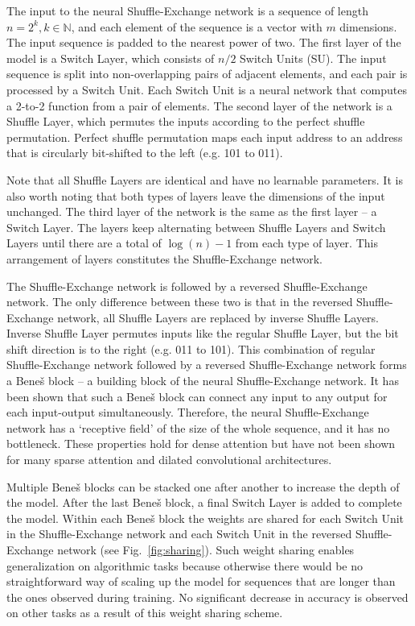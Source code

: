 \documentclass[letterpaper]{article} %
\begin{document}
The input to the neural Shuffle-Exchange network is a sequence of length $n=2^k, k \in \mathbb{N}$, and each element of the sequence is a vector with $m$ dimensions. The input sequence is padded to the nearest power of two. The first layer of the model is a Switch Layer, which consists of $n/2$ Switch Units (SU). The input sequence is split into non-overlapping pairs of adjacent elements, and each pair is processed by a Switch Unit. Each Switch Unit is a neural network that computes a 2-to-2 function from a pair of elements. The second layer of the network is a Shuffle Layer, which permutes the inputs according to the perfect shuffle permutation. Perfect shuffle permutation maps each input address to an address that is circularly bit-shifted to the left (e.g. 101 to 011).

Note that all Shuffle Layers are identical and have no learnable parameters. It is also worth noting that both types of layers leave the dimensions of the input unchanged. The third layer of the network is the same as the first layer -- a Switch Layer. The layers keep alternating between Shuffle Layers and Switch Layers until there are a total of $\log(n)-1$ from each type of layer. This arrangement of layers constitutes the Shuffle-Exchange network.

The Shuffle-Exchange network is followed by a reversed Shuffle-Exchange network. The only difference between these two is that in the reversed Shuffle-Exchange network, all Shuffle Layers are replaced by inverse Shuffle Layers. Inverse Shuffle Layer permutes inputs like the regular Shuffle Layer, but the bit shift direction is to the right (e.g. 011 to 101). This combination of regular Shuffle-Exchange network followed by a reversed Shuffle-Exchange network forms a Bene\v{s} block -- a building block of the neural Shuffle-Exchange network. It has been shown \citep{dally2004principles} that such a Bene\v{s} block can connect any input to any output for each input-output simultaneously. Therefore, the neural Shuffle-Exchange network has a `receptive field' of the size of the whole sequence, and it has no bottleneck. These properties hold for dense attention but have not been shown for many sparse attention and dilated convolutional architectures.

Multiple Bene\v{s} blocks can be stacked one after another to increase the depth of the model. After the last Bene\v{s} block, a final Switch Layer is added to complete the model. Within each Bene\v{s} block the weights are shared for each Switch Unit in the Shuffle-Exchange network and each Switch Unit in the reversed Shuffle-Exchange network (see Fig.~\ref{fig:sharing}). Such weight sharing enables generalization on algorithmic tasks because otherwise there would be no straightforward way of scaling up the model for sequences that are longer than the ones observed during training. No significant decrease in accuracy is observed on other tasks as a result of this weight sharing scheme.
\end{document}
